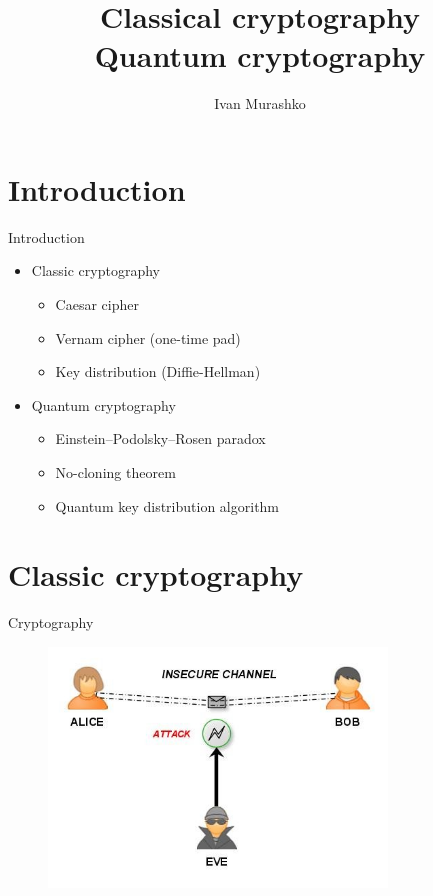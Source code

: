 \documentclass[10pt,pdf,hyperref={unicode}]{beamer}
\title[Quantum cryptography]{Classical
  cryptography\\Quantum cryptography}
\author{Ivan Murashko}
\date{}
\begin{document}
\begin{frame}
\titlepage
\end{frame}


\section{Introduction}

\begin{frame}{Introduction}
\begin{itemize}
\item Classic cryptography
  \begin{itemize}
    \item Caesar cipher
    \item Vernam cipher (one-time pad)
    \item Key distribution (Diffie-Hellman)
  \end{itemize}
\item Quantum cryptography
  \begin{itemize}
  \item Einstein–Podolsky–Rosen paradox
  \item No-cloning theorem
  \item Quantum key distribution algorithm
  \end{itemize}
\end{itemize}
\end{frame}

\section{Classic cryptography}

\begin{frame}{Cryptography}
 \begin{figure} 
   \includegraphics[width=90mm,scale=0.5]{alice-bob.png}
  \end{figure}
\end{frame}
\end{document}
